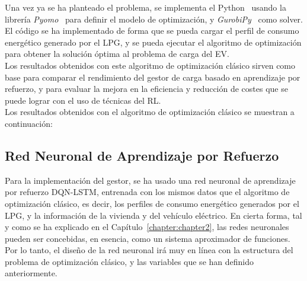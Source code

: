 Una vez ya se ha planteado el problema, se implementa el Python~\cite{python2024language}
usando la librería \textit{Pyomo}~\cite{pyomo2024} para definir el modelo de optimización, y
\textit{GurobiPy}~\cite{gurobi2024} como solver. El código se ha implementado de forma que se pueda
cargar el perfil de consumo energético generado por el LPG, y se pueda ejecutar el algoritmo de
optimización para obtener la solución óptima al problema de carga del EV.\\

Los resultados obtenidos con este algoritmo de optimización clásico sirven como base para
comparar el rendimiento del gestor de carga basado en aprendizaje por refuerzo, y para evaluar la
mejora en la eficiencia y reducción de costes que se puede lograr con el uso de técnicas del RL.\\ 

Los resultados obtenidos con el algoritmo de optimización clásico se muestran a continuación:


\subsection{Red Neuronal de Aprendizaje por Refuerzo}
Para la implementación del gestor, se ha usado una red neuronal de aprendizaje por refuerzo DQN-LSTM, 
entrenada con los mismos datos que el algoritmo de optimización clásico, es decir, los perfiles de
consumo energético generados por el LPG, y la información de la vivienda y del vehículo eléctrico. 
En cierta forma, tal y como se ha explicado en el Capítulo~\ref{chapter:chapter2}, las redes 
neuronales pueden ser concebidas, en esencia, como un sistema aproximador de funciones. Por lo 
tanto, el diseño de la red neuronal irá muy en línea con la estructura del problema de optimización
clásico, y las variables que se han definido anteriormente.\\

